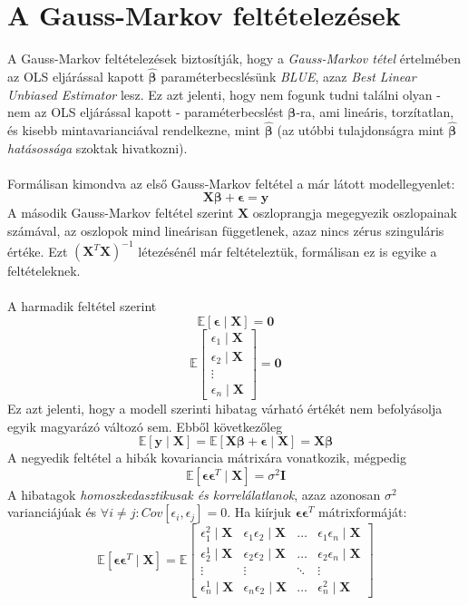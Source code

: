 \documentclass[14p]{report}
\def\pmb{\boldsymbol}
\def\ebeta{\hat{\pmb{\beta}}}
\def\e{\epsilon}
\begin{document}
	\section{A Gauss-Markov feltételezések}
	A Gauss-Markov feltételezések biztosítják, hogy a \emph{Gauss-Markov tétel} értelmében az OLS eljárással kapott $\ebeta$ paraméterbecslésünk \emph{BLUE}, azaz \emph{Best Linear Unbiased Estimator} lesz. Ez azt jelenti, hogy nem fogunk tudni találni olyan - nem az OLS eljárással kapott - paraméterbecslést $\pmb{\beta}$-ra, ami lineáris, torzítatlan, és kisebb mintavarianciával rendelkezne, mint $\ebeta$ (az utóbbi tulajdonságra mint $\ebeta$ \emph{hatásossága} szoktak hivatkozni).
	\\
	\\ 
	Formálisan kimondva az első Gauss-Markov feltétel a már látott modellegyenlet:
	\[
	\pmb{X}\pmb{\beta} + \pmb{\e} = \pmb{y}
	\]
	A második Gauss-Markov feltétel szerint $\pmb{X}$ oszloprangja megegyezik oszlopainak számával, az oszlopok mind lineárisan függetlenek, azaz nincs zérus szinguláris értéke. Ezt $(\pmb{X}^T\pmb{X})^{-1}$ létezésénél már feltételeztük, formálisan ez is egyike a feltételeknek.
	\\
	\\
	A harmadik feltétel szerint
	\[
	\mathbb{E}[\pmb{\e} \mid \pmb{X}] = \pmb{0}
	\]
	\[
	\mathbb{E}
	\begin{bmatrix}
		\e_1 \mid \pmb{X} \\
		\e_2 \mid \pmb{X} \\
		\vdots \\
		\e_n \mid \pmb{X}
	\end{bmatrix}
	= \pmb{0}
	\]
	Ez azt jelenti, hogy a modell szerinti hibatag várható értékét nem befolyásolja egyik magyarázó változó sem. Ebből következőleg
	\[
	\mathbb{E}[\pmb{y} \mid \pmb{X}] = \mathbb{E}[\pmb{X}\pmb{\beta} + \pmb{\e} \mid \pmb{X}] = \pmb{X}\pmb{\beta}
	\]
	A negyedik feltétel a hibák kovariancia mátrixára vonatkozik, mégpedig
	\[
	\mathbb{E}[\pmb{\e}\pmb{\e}^T \mid \pmb{X}] = \sigma^2\pmb{I}
	\]
	A hibatagok \emph{homoszkedasztikusak és korrelálatlanok}, azaz azonosan $\sigma^2$ varianciájúak és $\forall i \ne j : Cov[\e_i, \e_j] = 0$. Ha kiírjuk $\pmb{\e}\pmb{\e}^T$ mátrixformáját:
	\[
	\mathbb{E}[\pmb{\e}\pmb{\e}^T \mid \pmb{X}] =
	\mathbb{E}
	\begin{bmatrix}
		\e_1^2 \mid \pmb{X} & \e_1 \e_2 \mid \pmb{X} & \dots & \e_1 \e_n \mid \pmb{X} \\
		\e_2^1 \mid \pmb{X} & \e_2 \e_2 \mid \pmb{X} & \dots & \e_2 \e_n \mid \pmb{X} \\
		\vdots & \vdots & \ddots & \vdots \\
		\e_n^1 \mid \pmb{X} & \e_n \e_2 \mid \pmb{X} & \dots & \e_n^2 \mid \pmb{X}
	\end{bmatrix}
	\]
\end{document}
